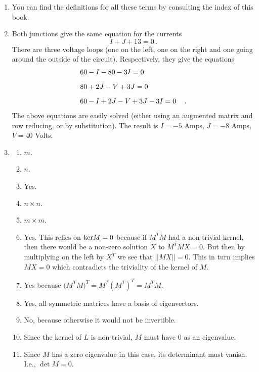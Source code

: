 \begin{enumerate}
\item You can find the definitions for all these terms by consulting the index of this book.

\item Both junctions give the same equation for the currents
$$
I+J+13=0\, .
$$
There are three voltage loops (one on the left, one on the right and one going around the outside of the circuit). Respectively, they give the equations
\begin{eqnarray}
&60-I-80-3I=0&\nonumber\\[2mm]
&80+2J-V+3J=0&\nonumber\\[2mm]
&60-I+2J-V+3J-3I=0&\, .
\end{eqnarray}
The above equations are easily solved (either using an augmented matrix and row reducing, or by substitution). The result is $I=-5$ Amps, $J=-8$ Amps, $V=40$ Volts.



\item 
\begin{enumerate}
\item $m$.
\item $n$.
\item Yes.
\item $n\times n$.
\item $m\times m$.
\item Yes. This relies on ${\rm ker} M=0$ because if $M^T M$ had a non-trivial kernel, then there would be a non-zero solution $X$ to $M^T M X=0$. But then by multiplying on the left by $X^T$ we see that $||MX||=0$. This in turn implies $MX=0$ which contradicts the triviality of the kernel of $M$. 
\item Yes because $\big(M^T M\big)^T=M^T (M^T)^T=M^T M$.
\item Yes, all symmetric matrices have a basis of eigenvectors.
\item No, because otherwise it would not be invertible.
\item Since the kernel of $L$ is non-trivial, $M$ must have $0$ as an eigenvalue.
\item Since $M$ has a zero eigenvalue in this case, its determinant must vanish. {I.e.}, $\det M=0$.
\end{enumerate}


\end{enumerate}
